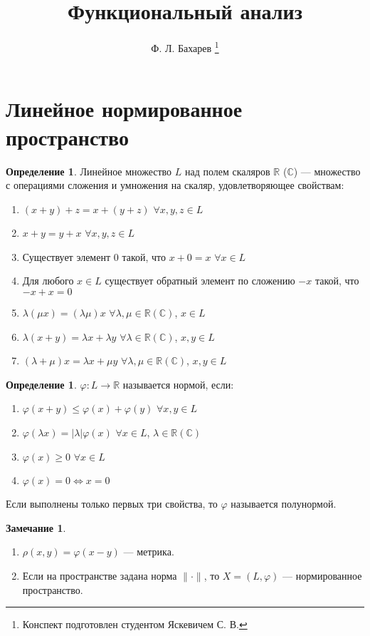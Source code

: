 \documentclass[11pt,openany,a4paper]{scrartcl}
\author{Ф. Л. Бахарев \thanks{Конспект подготовлен студентом Яскевичем С. В.}}
\title{Функциональный анализ}
\theoremstyle{plain}
\theoremstyle{definition}
\newtheorem{definition}[theorem]{Определение}
\newtheorem{remark}[theorem]{Замечание}
\newcommand\mb{\mathbb}
\newcommand\real{\mb R}
\newcommand{\complex}{\mb C}
\begin{document}
\maketitle

\tableofcontents

\pagebreak

\section{Линейное нормированное пространство}

\begin{definition}
    Линейное множество $L$ над полем скаляров $\real$ ($\complex$) — множество с
    операциями сложения и умножения на скаляр, удовлетворяющее свойствам:
    \begin{enumerate}
        \item $(x + y) + z = x + (y + z)$ $\forall x,y,z \in L$
        \item $x + y = y + x$ $\forall x,y,z \in L$
        \item Существует элемент $0$ такой, что $x + 0 = x$ $\forall x \in L$
        \item Для любого $x \in L$ существует обратный элемент по сложению $-x$ такой, что
        $-x + x = 0$
        \item $\lambda(\mu x) = (\lambda \mu) x$ $\forall \lambda, \mu
        \in \real(\complex)$, $x \in L$
        \item $\lambda(x + y) = \lambda x + \lambda y$ $\forall \lambda \in 
        \real(\complex)$, $x,y \in L$
        \item $(\lambda + \mu)x = \lambda x + \mu y$ $\forall \lambda,
        \mu \in \real(\complex)$, $x,y \in L$
    \end{enumerate}
\end{definition}

\begin{definition}
    $\varphi: L \to \real$ называется нормой, если:
    \begin{enumerate}
        \item $\varphi(x + y) \leqslant \varphi(x) + \varphi(y)$
        $\forall x, y \in L$
        \item $\varphi(\lambda x) = |\lambda|\varphi(x)$
        $\forall x \in L$, $\lambda \in \real(\complex)$
        \item $\varphi(x) \geqslant 0$ $\forall x \in L$
        \item $\varphi (x) = 0 \iff x = 0$
    \end{enumerate}

    Если выполнены только первых три свойства, то $\varphi$ называется полунормой.
\end{definition}
\begin{remark}
\mbox{}
    \begin{enumerate}
        \item $\rho (x, y) = \varphi(x - y)$ — метрика.
        \item Если на пространстве задана норма $\|\cdot\|$, то $X = (L, \varphi)$ —
        нормированное пространство.
    \end{enumerate}
\end{remark}
\end{document}
